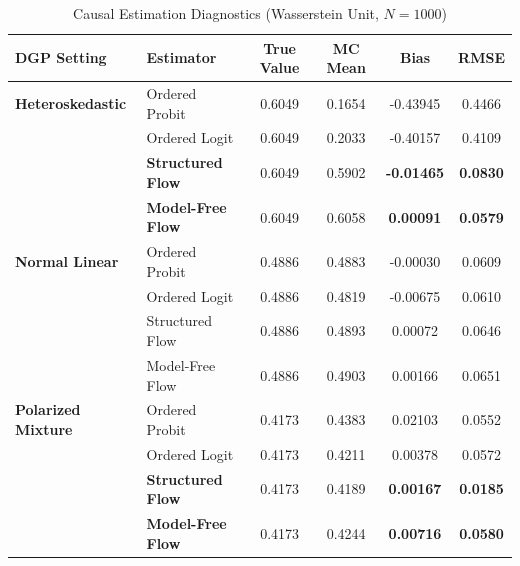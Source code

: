 \begin{table}[htbp]
\centering
\caption{Causal Estimation Diagnostics (Wasserstein Unit, $N=1000$)}
\label{tab:main_diagnostics}
\begin{tabular}{llcccc}
\toprule
\textbf{DGP Setting} & \textbf{Estimator} & \textbf{True Value} & \textbf{MC Mean} & \textbf{Bias} & \textbf{RMSE} \\
\midrule
\textbf{Heteroskedastic} & Ordered Probit & 0.6049 & 0.1654 & -0.43945 & 0.4466 \\
 & Ordered Logit & 0.6049 & 0.2033 & -0.40157 & 0.4109 \\
 & \textbf{Structured Flow} & 0.6049 & 0.5902 & \textbf{-0.01465} & \textbf{0.0830} \\
 & \textbf{Model-Free Flow} & 0.6049 & 0.6058 & \textbf{0.00091} & \textbf{0.0579} \\
\midrule
\textbf{Normal Linear} & Ordered Probit & 0.4886 & 0.4883 & -0.00030 & 0.0609 \\
 & Ordered Logit & 0.4886 & 0.4819 & -0.00675 & 0.0610 \\
 & Structured Flow & 0.4886 & 0.4893 & 0.00072 & 0.0646 \\
 & Model-Free Flow & 0.4886 & 0.4903 & 0.00166 & 0.0651 \\
\midrule
\textbf{Polarized Mixture} & Ordered Probit & 0.4173 & 0.4383 & 0.02103 & 0.0552 \\
 & Ordered Logit & 0.4173 & 0.4211 & 0.00378 & 0.0572 \\
 & \textbf{Structured Flow} & 0.4173 & 0.4189 & \textbf{0.00167} & \textbf{0.0185} \\
 & \textbf{Model-Free Flow} & 0.4173 & 0.4244 & \textbf{0.00716} & \textbf{0.0580} \\
\bottomrule
\end{tabular}
\end{table}
